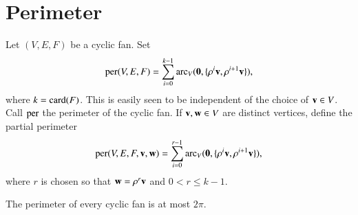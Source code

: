 



\section{Perimeter}


\begin{definition}[perimeter]\label{lemma:perim}
Let $(V,E,F)$ be a cyclic fan.    Set
$$
{\operatorname{per}}(V,E,F) = \sum_{i=0}^{k-1} \operatorname{arc}_V({\mathbf 0},\{\rho^i {\mathbf v},\rho^{i+1} {\mathbf v}\}), 
$$
where  $k={\operatorname{card}}(F)$.
This is easily seen to be independent of the choice of ${\mathbf v}\in V$.  Call ${\operatorname{per}}$ the perimeter of the cyclic fan.
If ${\mathbf v},{\mathbf w}\in V$ are distinct vertices, define the partial perimeter 
$$
{\operatorname{per}}(V,E,F,{\mathbf v},{\mathbf w}) = \sum_{i=0}^{r-1} \operatorname{arc}_V({\mathbf 0},\{\rho^i {\mathbf v},\rho^{i+1} {\mathbf v}\}), 
$$
where $r$ is chosen so that ${\mathbf w}=\rho^r {\mathbf v}$ and $0<r\le k-1$.
\end{definition}
%
%
%



\begin{lemma}
 The perimeter of every cyclic fan is at most $2\pi$.
\end{lemma}
%
%

